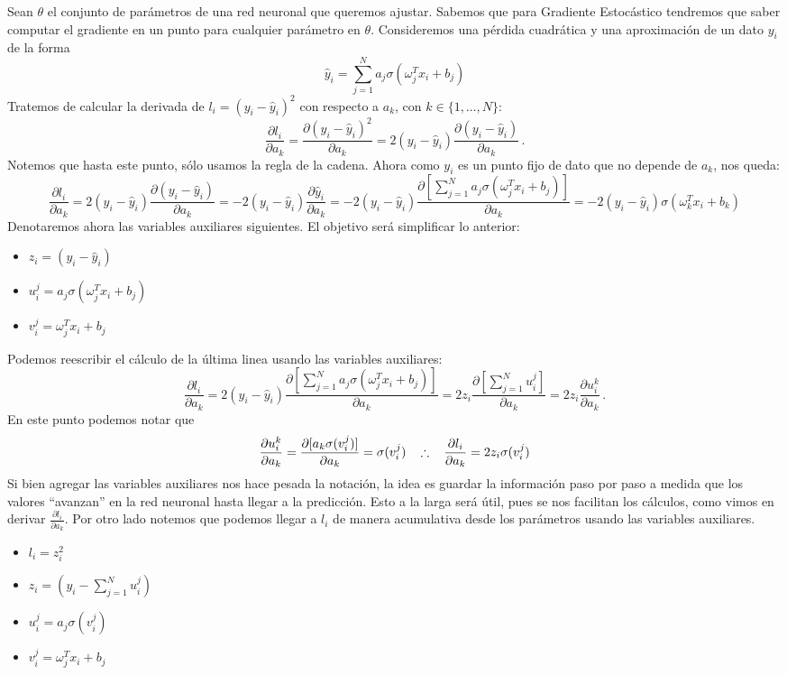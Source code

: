 \documentclass[letterpaper,11pt]{article} %
\def\espacio{\hspace{.25cm}\,}
\theoremstyle{defbreak}
\theoremstyle{propbreak}
\theoremstyle{remark}
\theoremstyle{break}
\begin{document}
\newp Sean $\theta$ el conjunto de parámetros de una red neuronal que queremos ajustar. Sabemos que para Gradiente Estocástico tendremos que saber computar el gradiente en un punto para cualquier parámetro en $\theta$. Consideremos una pérdida cuadrática y una aproximación de un dato $y_i$ de la forma
$$ \hat y_i = \displaystyle \sum^N_{j=1} a_j\sigma(\omega^T_j x_i+b_j) $$
Tratemos de calcular la derivada de $l_i=(y_i-\hat y_i)^2$ con respecto a $a_k$, con $k\in\{1,\dots,N\}$:
$$ \frac{\partial l_i}{\partial a_k} = \frac{\partial (y_i-\hat y_i)^2}{\partial a_k} = 2(y_i-\hat y_i) \frac{\partial (y_i-\hat y_i)}{\partial a_k} \,.$$
Notemos que hasta este punto, sólo usamos la regla de la cadena. Ahora como $y_i$ es un punto fijo de dato que no depende de $a_k$, nos queda:
$$ \frac{\partial l_i}{\partial a_k} = 2(y_i-\hat y_i) \frac{\partial (y_i-\hat y_i)}{\partial a_k} =  -2(y_i-\hat y_i) \frac{\partial\hat y_i}{\partial a_k} =  -2(y_i-\hat y_i) \frac{\partial[\sum^N_{j=1} a_j\sigma(\omega^T_j x_i+b_j)]}{\partial a_k} = -2(y_i-\hat y_i)\sigma(\omega_k^Tx_i+b_k)$$
Denotaremos ahora las variables auxiliares siguientes. El objetivo será simplificar lo anterior:
\begin{itemize}
    \item $z_i = (y_i-\hat y_i)$
    \item $u^j_i = a_j\sigma(\omega^T_j x_i+b_j)$
    \item $v^j_i = \omega^T_j x_i+b_j$
\end{itemize}
Podemos reescribir el cálculo de la última linea usando las variables auxiliares:
$$ \frac{\partial l_i}{\partial a_k} = 2(y_i-\hat y_i) \frac{\partial[\sum^N_{j=1} a_j\sigma(\omega^T_j x_i+b_j)]}{\partial a_k} = 2z_i \frac{\partial[\sum^N_{j=1} u^j_i]}{\partial a_k} = 2z_i \frac{\partial u_i^k}{\partial a_k} \,.$$
En este punto podemos notar que 
$$ \frac{\partial u_i^k}{\partial a_k} = \frac{\partial[a_k \sigma(v_i^j)]}{\partial a_k} = \sigma(v_i^j) \espacio \therefore \espacio \frac{\partial l_i}{\partial a_k}=2z_i \sigma(v_i^j)$$
Si bien agregar las variables auxiliares nos hace pesada la notación, la idea es guardar la información paso por paso a medida que los valores ``avanzan'' en la red neuronal hasta llegar a la predicción. Esto a la larga será útil, pues se nos facilitan los cálculos, como vimos en derivar $\frac{\partial l_i}{\partial a_k}$. Por otro lado notemos que podemos llegar a $l_i$ de manera acumulativa desde los parámetros usando las variables auxiliares.
\begin{itemize}
    \item $l_i = z_i^2$
    \item $z_i = (y_i-\sum^N_{j=1}u_i^j)$
    \item $u^j_i = a_j\sigma(v_i^j)$
    \item $v_i^j = \omega^T_j x_i+b_j$
\end{itemize}
\end{document}
